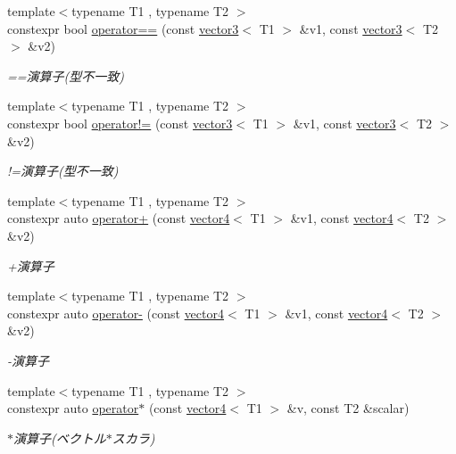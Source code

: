 \begin{DoxyCompactItemize}
{\footnotesize template$<$typename T1 , typename T2 $>$ }\\constexpr bool \mbox{\hyperlink{namespacesaki_a5f3eb3ebd6a3ee43771849069101153f}{operator==}} (const \mbox{\hyperlink{classsaki_1_1vector3}{vector3}}$<$ T1 $>$ \&v1, const \mbox{\hyperlink{classsaki_1_1vector3}{vector3}}$<$ T2 $>$ \&v2)
\begin{DoxyCompactList}\small\item\em ==演算子(型不一致) \end{DoxyCompactList}\item 
{\footnotesize template$<$typename T1 , typename T2 $>$ }\\constexpr bool \mbox{\hyperlink{namespacesaki_ae8393ad670f8bb199a92d4287bb1bf3a}{operator!=}} (const \mbox{\hyperlink{classsaki_1_1vector3}{vector3}}$<$ T1 $>$ \&v1, const \mbox{\hyperlink{classsaki_1_1vector3}{vector3}}$<$ T2 $>$ \&v2)
\begin{DoxyCompactList}\small\item\em !=演算子(型不一致) \end{DoxyCompactList}\item 
{\footnotesize template$<$typename T1 , typename T2 $>$ }\\constexpr auto \mbox{\hyperlink{namespacesaki_aba02830a0fe4fd92a264f80bd5f6cd65}{operator+}} (const \mbox{\hyperlink{classsaki_1_1vector4}{vector4}}$<$ T1 $>$ \&v1, const \mbox{\hyperlink{classsaki_1_1vector4}{vector4}}$<$ T2 $>$ \&v2)
\begin{DoxyCompactList}\small\item\em +演算子 \end{DoxyCompactList}\item 
{\footnotesize template$<$typename T1 , typename T2 $>$ }\\constexpr auto \mbox{\hyperlink{namespacesaki_a9b9369c0656bd3b8b940eadf027b41f3}{operator-\/}} (const \mbox{\hyperlink{classsaki_1_1vector4}{vector4}}$<$ T1 $>$ \&v1, const \mbox{\hyperlink{classsaki_1_1vector4}{vector4}}$<$ T2 $>$ \&v2)
\begin{DoxyCompactList}\small\item\em -\/演算子 \end{DoxyCompactList}\item 
{\footnotesize template$<$typename T1 , typename T2 $>$ }\\constexpr auto \mbox{\hyperlink{namespacesaki_a0fe5418c09468a2435c0a8a85a941174}{operator$\ast$}} (const \mbox{\hyperlink{classsaki_1_1vector4}{vector4}}$<$ T1 $>$ \&v, const T2 \&scalar)
\begin{DoxyCompactList}\small\item\em $\ast$演算子(ベクトル$\ast$スカラ) \end{DoxyCompactList}\item 

\end{DoxyCompactItemize}
